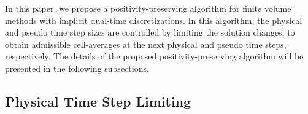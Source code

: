 In this paper, we propose a positivity-preserving algorithm for finite volume methods with implicit dual-time discretizations. In this algorithm, the physical and pseudo time step sizes are controlled by limiting the solution changes, to obtain admissible cell-averages at the next physical and pseudo time steps, respectively. The details of the proposed positivity-preserving algorithm will be presented in the following subsections.

%

\subsection{Physical Time Step Limiting}
\label{ssec:physical-limiting}

